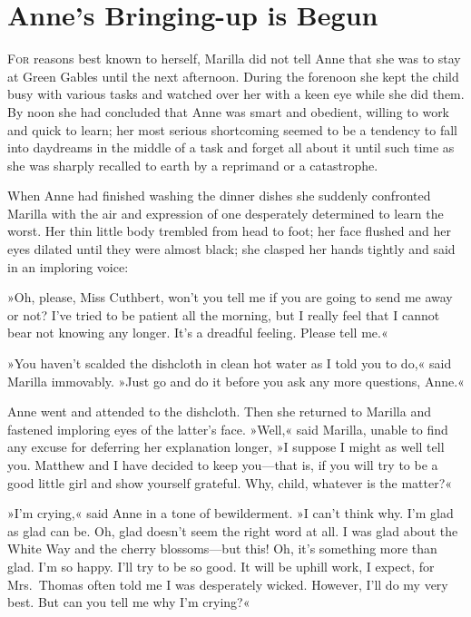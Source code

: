 \chapter{Anne's Bringing-up is Begun}

\lettrine[lines=4]{F}{or} reasons best known to herself, Marilla did not tell Anne that she was to stay at Green Gables until the next afternoon. During the forenoon she kept the child busy with various tasks and watched over her with a keen eye while she did them. By noon she had concluded that Anne was smart and obedient, willing to work and quick to learn; her most serious shortcoming seemed to be a tendency to fall into daydreams in the middle of a task and forget all about it until such time as she was sharply recalled to earth by a reprimand or a catastrophe.

When Anne had finished washing the dinner dishes she suddenly confronted Marilla with the air and expression of one desperately determined to learn the worst. Her thin little body trembled from head to foot; her face flushed and her eyes dilated until they were almost black; she clasped her hands tightly and said in an imploring voice:

»Oh, please, Miss Cuthbert, won't you tell me if you are going to send me away or not? I've tried to be patient all the morning, but I really feel that I cannot bear not knowing any longer. It's a dreadful feeling. Please tell me.«

»You haven't scalded the dishcloth in clean hot water as I told you to do,« said Marilla immovably. »Just go and do it before you ask any more questions, Anne.«

Anne went and attended to the dishcloth. Then she returned to Marilla and fastened imploring eyes of the latter's face. »Well,« said Marilla, unable to find any excuse for deferring her explanation longer, »I suppose I might as well tell you. Matthew and I have decided to keep you—that is, if you will try to be a good little girl and show yourself grateful. Why, child, whatever is the matter?«

»I'm crying,« said Anne in a tone of bewilderment. »I can't think why. I'm glad as glad can be. Oh, glad doesn't seem the right word at all. I was glad about the White Way and the cherry blossoms—but this! Oh, it's something more than glad. I'm so happy. I'll try to be so good. It will be uphill work, I expect, for Mrs.~Thomas often told me I was desperately wicked. However, I'll do my very best. But can you tell me why I'm crying?«


